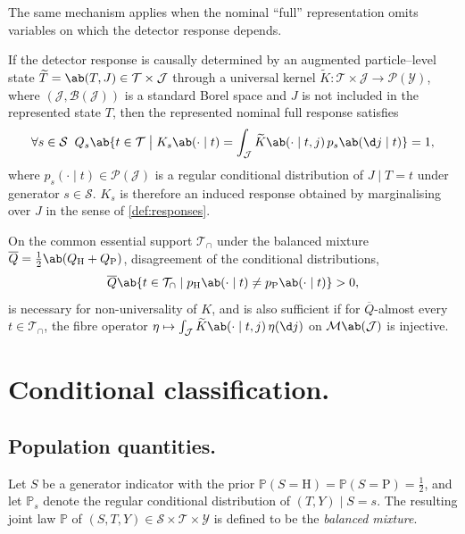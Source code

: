 \documentclass[12pt]{article}
\newcommand{\Herwig}{\mathrm{H}}
\newcommand{\Pythia}{\mathrm{P}}
\newcommand{\Prb}{\mathbb{P}}
\newcommand{\Gens}{\mathcal{S}}
\newcommand{\Meas}{\mathcal{P}}
\newcommand{\Sgn}{\mathcal{M}}
\newcommand{\Borel}{\mathcal{B}}
\newcommand{\1}{\mathbbm{1}}
\renewcommand{\[}{\begin{equation}}
\renewcommand{\]}{\end{equation}}
\begin{document}
    The same mechanism applies when the nominal ``full'' representation omits variables on which the detector response depends.

\begin{corollary}
    \label{cor:omitted}
        If the detector response is causally determined by an augmented particle--level state \(\widetilde T = \ab(T, J) \in \mathcal T \times \mathcal J\) through a universal kernel \(\widetilde K : \mathcal T \times \mathcal J \to \Meas(\mathcal Y)\), where \((\mathcal J, \Borel(\mathcal J))\) is a standard Borel space and \(J\) is not included in the represented state \(T\),
        then the represented nominal full response satisfies
        \[
        \label{eq:omitted}
            \forall s\in\Gens \;\; Q_s \ab\{ t\in\mathcal T \;\big|\; K_s \ab( \cdot \mid t) = \int_{\mathcal J} \widetilde K \ab( \cdot \mid t, j) \, p_s \ab(\d j \mid t)\} = 1,
        \]
        where \(p_s(\cdot \mid t) \in \Meas(\mathcal J)\) is a regular conditional distribution of \(J \mid T = t\) under generator \(s \in \Gens\).
        \(K_s\) is therefore an induced response obtained by marginalising over \(J\) in the sense of \cref{def:responses}.
    
        On the common essential support \(\mathcal T_\cap\) under the balanced mixture \(\overline Q = \frac{1}{2} \ab(Q_\Herwig + Q_\Pythia)\), disagreement of the conditional distributions,
        \[
            \overline Q \ab\{ t \in \mathcal T_\cap \mid p_\Herwig \ab(\cdot \mid t) \ne p_\Pythia \ab(\cdot \mid t) \} > 0,
        \]
        is necessary for non-universality of \(K\), and is also sufficient if for \(\overline Q\)-almost every \(t \in \mathcal T_\cap\), the fibre operator \(\eta \mapsto \int_{\mathcal J} \widetilde K \ab(\cdot \mid t, j)\,\eta(\d j)\) on \(\Sgn \ab(\mathcal J)\) is injective.
    \end{corollary}

\section{Conditional classification.}
\label{sec:classification}

    \subsection{Population quantities.}

    \begin{definition}
            Let \(S\) be a generator indicator with the prior \( \Prb ( S = \Herwig ) = \Prb( S = \Pythia ) = \frac12 \), and let \(\Prb_s\) denote the regular conditional distribution of \((T, Y)\mid S = s\).
            The resulting joint law \(\Prb\) of \((S,T,Y) \in \Gens \times \mathcal T \times \mathcal Y\) is defined to be the \emph{balanced mixture}.
    \end{definition}
\end{document}
